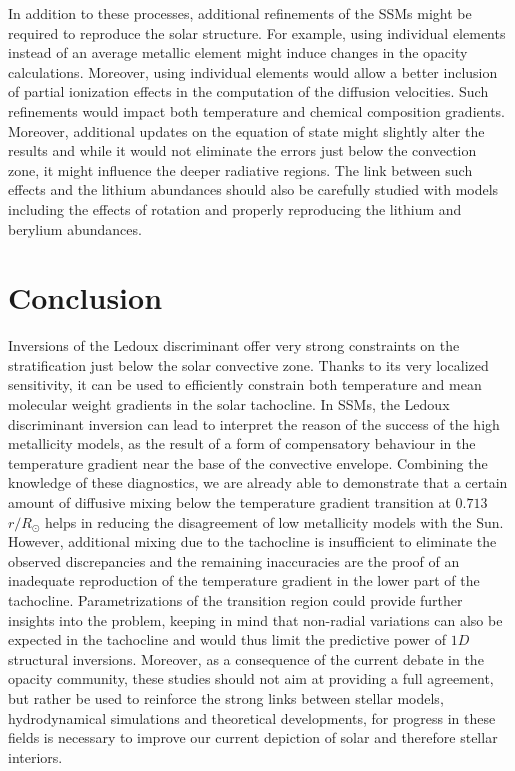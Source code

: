 \documentclass[a4paper,fleqn,usenatbib]{mnras}
\begin{document}
In addition to these processes, additional refinements of the SSMs might be required to reproduce the solar structure. For example, using individual elements instead of an average metallic element might induce changes in the opacity calculations. Moreover, using individual elements would allow a better inclusion of partial ionization effects in the computation of the diffusion velocities. Such refinements would impact both temperature and chemical composition gradients. Moreover, additional updates on the equation of state might slightly alter the results and while it would not eliminate the errors just below the convection zone, it might influence the deeper radiative regions. The link between such effects and the lithium abundances should also be carefully studied with models including the effects of rotation and properly reproducing the lithium and berylium abundances. 

\section{Conclusion}

Inversions of the Ledoux discriminant offer very strong constraints on the stratification just below the solar convective zone. Thanks to its very localized sensitivity, it can be used to efficiently constrain both temperature and mean molecular weight gradients in the solar tachocline. In SSMs, the Ledoux discriminant inversion can lead to interpret the reason of the success of the high metallicity models, as the result of a form of compensatory behaviour in the temperature gradient near the base of the convective envelope. Combining the knowledge of these diagnostics, we are already able to demonstrate that a certain amount of diffusive mixing below the temperature gradient transition at $0.713$ $r/R_{\odot}$ helps in reducing the disagreement of low metallicity models with the Sun. However, additional mixing due to the tachocline is insufficient to eliminate the observed discrepancies and the remaining inaccuracies are the proof of an inadequate reproduction of the temperature gradient in the lower part of the tachocline. Parametrizations of the transition region could provide further insights into the problem, keeping in mind that non-radial variations can also be expected in the tachocline and would thus limit the predictive power of $1D$ structural inversions. Moreover, as a consequence of the current debate in the opacity community, these studies should not aim at providing a full agreement, but rather be used to reinforce the strong links between stellar models, hydrodynamical simulations and theoretical developments, for progress in these fields is necessary to improve our current depiction of solar and therefore stellar interiors.






\bsp	%
\label{lastpage}
\end{document}
